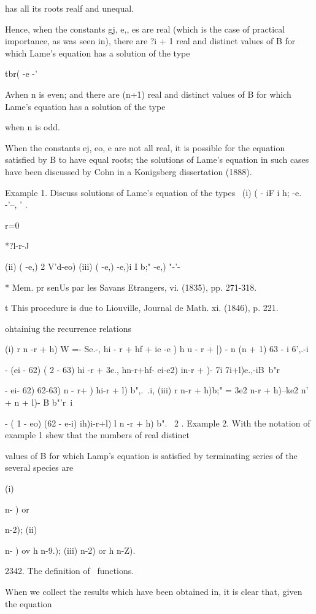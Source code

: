 {{{{has all its roots realf and unequal.

Hence, when the constants gj, e,, es are real (which is the case of
practical importance, as was seen in), there are ?i + 1 real
and distinct values of B for which Lame's equation has a solution of
the type

tbr( -e -'

Avhen n is even; and there are (n+1) real and distinct values of B for
which Lame's equation has a solution of the type

when n is odd.

When the constants ej, eo, e are not all real, it is possible for the
equation satisfied by B to have equal roots; the solutions of Lame's
equation in such cases have been discussed by Cohn in a Konigsberg
dissertation (1888).

Example 1. Discuss solutions of Lame's equation of the types \ (i) ( -
iF i h; -e. -'--, ' .

r=0

*?l-r-J

(ii) ( -e,) 2 V'd-eo) (iii) ( -e,) -e,)i I b;" -e,) "-'-\

* Mem. pr senUs par les Savans Etrangers, vi. (1835), pp. 271-318.

t This procedure is due to Liouville, Journal de Math. xi. (1846), p.
221.

%
%

ohtainiug the recurrence relations

(i) r n -r + h) W =- Se.-, hi - r + hf + ie -e ) h u - r + |) - n (n +
1) 63 - i 6',.-i

- (ei - 62) ( 2 - 63) hi -r + %
3e., hn-r+hf- ei-e2) in-r + )- 7i 7i+l)e.,-iB\ b"r\,

- ei- 62) 62-63) n - r+ ) hi-r + l) b",.\ .i, (iii) r n-r + h)b;" =
3e2 n-r + h)--ke2 n' + n + l)- B b"'r\ i

- ( 1 - eo) (62 - e-i) ih)i-r+l) l n -r + h) b". \ 2 . Example 2. With
the notation of example 1 shew that the numbers of real distinct

values of B for which Lamp's equation is satisfied by terminating
series of the several species are

(i) \ \ {n- ) or \ \ {n-2); (ii) \ \ {n- ) ov h n-9.); (iii) n-2) or h
n-Z).

2342. The definition of \Lame\ functions.

When we collect the results which have been obtained in, it is
clear that, given the equation

}}}}}}}
